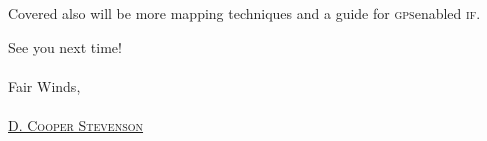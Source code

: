 Covered also will be more mapping techniques and a guide for
\textsc{gps}\textendash enabled \textsc{if}.

See you next time! \\ \\

\noindent Fair Winds, \\ \\

\noindent\textsc{\href{mailto:cooper@discdigest.xyz}{D. Cooper Stevenson}}




